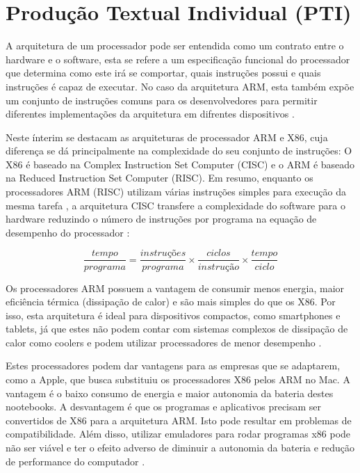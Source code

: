 \chapter{Produção Textual Individual (PTI)}
\label{pti}

A arquitetura de um processador
pode ser entendida como um contrato entre o hardware e o software,
esta se refere a um especificação funcional do processador que determina
como este irá se comportar, quais instruções possui
e quais instruções é capaz de executar. No caso da arquitetura ARM, esta também expõe um conjunto
de instruções comuns para os desenvolvedores para permitir diferentes implementações da arquitetura
em difrentes dispositivos \cite{arm}.

Neste ínterim se destacam as arquiteturas de processador ARM e X86, cuja
diferença se dá principalmente na complexidade do seu conjunto de instruções: O X86 é baseado na
Complex Instruction Set Computer (CISC) e o ARM é baseado na Reduced Instruction Set Computer (RISC).
Em resumo, enquanto os processadores ARM (RISC) utilizam várias instruções simples para execução da mesma tarefa \cite{tndbrasil}, a arquitetura CISC transfere a complexidade do software para o hardware reduzindo 
o número de instruções por programa na
equação de desempenho do processador \cite{bhandarkar}:

\begin{equation}
 \frac{tempo}{programa} = \frac{instruções}{programa} \times \frac{ciclos}{instrução} \times \frac{tempo}{ciclo}
\end{equation}

Os processadores ARM possuem a vantagem de consumir menos energia, maior eficiência térmica (dissipação de calor) e são
mais simples do que os X86. Por isso, esta arquitetura é ideal para dispositivos compactos, como smartphones e tablets,
já que estes não podem contar com sistemas complexos de dissipação de calor como coolers e podem utilizar processadores
de menor desempenho \cite{canaltech}.

Estes processadores podem dar vantagens para as empresas que se adaptarem, como a Apple, que busca
substituiu os processadores X86 pelos ARM no Mac.
A vantagem é o baixo consumo de energia e maior autonomia da bateria destes nootebooks.
A desvantagem é que os programas e aplicativos precisam ser convertidos de X86 para a arquitetura ARM. Isto
pode resultar em problemas de compatibilidade.
Além disso, utilizar emuladores para rodar programas x86 pode não ser viável e ter o efeito
adverso de diminuir a autonomia da bateria e redução de performance do computador \cite{super}.
